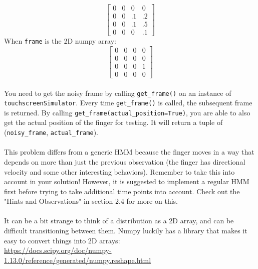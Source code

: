 \documentclass{article}
\begin{document}
    $$
    \begin{bmatrix}
        0 & 0 & 0 & 0 \\
        0 & 0 & .1 & .2 \\
        0 & 0 & .1 & .5 \\
        0 & 0 & 0 & .1
    \end{bmatrix}
    $$
    When \texttt{frame} is the 2D numpy array:
    $$
    \begin{bmatrix}
        0 & 0 & 0 & 0 \\
        0 & 0 & 0 & 0 \\
        0 & 0 & 0 & 1 \\
        0 & 0 & 0 & 0
    \end{bmatrix}
    $$
    \\
    You need to get the noisy frame by calling \texttt{get\_frame()} on an instance of \texttt{touchscreenSimulator}. Every time \texttt{get\_frame()} is called, the subsequent frame is returned. By calling \texttt{get\_frame(actual\_position=True)}, you are able to also get the actual position of the finger for testing. It will return a tuple of (\texttt{noisy\_frame}, \texttt{actual\_frame}).\\\\
    This problem differs from a generic HMM because the finger moves in a way that depends on more than just the previous observation (the finger has directional velocity and some other interesting behaviors). Remember to take this into account in your solution! However, it is suggested to implement a regular HMM first before trying to take additional time points into account. Check out the "Hints and Observations" in section 2.4 for more on this.\\\\
    It can be a bit strange to think of a distribution as a 2D array, and can be difficult transitioning between
    them. Numpy luckily has a library that makes it easy to convert things into 2D arrays:\\
    \url{https://docs.scipy.org/doc/numpy-1.13.0/reference/generated/numpy.reshape.html}
\end{document}
